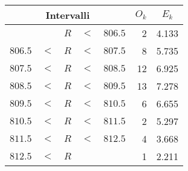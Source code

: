 \begin{tabular}{ccccc|rc}\hline
    \multicolumn{5}{c}{Intervalli}                  & $O_k$    & $E_k$       \\
    \hline\hline
                  &     & $R$ & $<$ & $\num{806.5}$ & \num{2}  & \num{4.133} \\
    $\num{806.5}$ & $<$ & $R$ & $<$ & $\num{807.5}$ & \num{8}  & \num{5.735} \\
    $\num{807.5}$ & $<$ & $R$ & $<$ & $\num{808.5}$ & \num{12} & \num{6.925} \\
    $\num{808.5}$ & $<$ & $R$ & $<$ & $\num{809.5}$ & \num{13} & \num{7.278} \\
    $\num{809.5}$ & $<$ & $R$ & $<$ & $\num{810.5}$ & \num{6}  & \num{6.655} \\
    $\num{810.5}$ & $<$ & $R$ & $<$ & $\num{811.5}$ & \num{2}  & \num{5.297} \\
    $\num{811.5}$ & $<$ & $R$ & $<$ & $\num{812.5}$ & \num{4}  & \num{3.668} \\
    $\num{812.5}$ & $<$ & $R$ &     &               & \num{1}  & \num{2.211} \\
    \hline
\end{tabular}